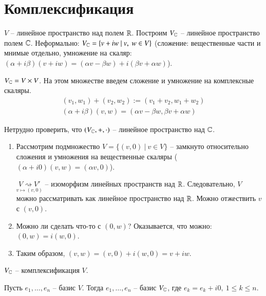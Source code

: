 \documentclass[main]{subfiles}
\begin{document}
\chapter{Комплексификация}

$V$ -- линейное пространство над полем $\mathbb{R}$. Построим $V_{\mathbb{C}}$ -- линейное пространство 
полем $\mathbb{C}$. Неформально: $V_{\mathbb{C}} = \{v +  iw \ | \ v, \ w \in V\}$ (сложение: вещественные части и мнимые отдельно, 
умножение на скаляр: $(\alpha + i\beta) (v + iw) = (\alpha v - \beta w) + i(\beta v + \alpha w)$).

$V_{\mathbb{C}} = V\times V$. На этом множестве введем сложение и умножение на комплексные скаляры.
\begin{gather*}
    (v_1,w_1) + (v_2, w_2) := (v_1 + v_2, w_1 + w_2)  \\
    (\alpha + i\beta) (v, w) = (\alpha v - \beta w, \beta v + \alpha w)
\end{gather*}

Нетрудно проверить, что $(V_{\mathbb{C}}, +, \cdot)$ -- линейное пространство над $\mathbb{C}$.

\begin{enumerate}
    \item Рассмотрим подмножество $V = \{(v, 0) \ | \ v \in V\}$ -- 
    замкнуто относительно сложения и умножения на вещественные скаляры 
    ($(\alpha + i0)(v, w) = (\alpha v, 0)$).
    
    $\underset{v \mapsto (v, 0)}{V \rightsquigarrow V'}$ -- изоморфизм линейных пространств над $\mathbb{R}$. Следовательно, 
    $V$ можно рассматривать как линейное пространство над $\mathbb{R}$. Можно отжествить $v$ с $(v, 0)$.
    \item Можно ли сделать что-то с $(0, w)$? Оказывается, что можно: $(0, w) = i(w, 0)$.
    \item Таким образом, $(v, w) = (v, 0) + i(w, 0) = v +iw$.
\end{enumerate}

$V_{\mathbb{C}}$ -- комплексификация $V$.

\begin{corollary}
    Пусть $e_1, \ldots, e_n$ -- базис $V$. Тогда $e_1, \ldots, e_n$ -- базис $V_{\mathbb{C}}$, где $e_k = e_k + i0, \ 1 \leqslant k\leqslant n $.
\end{corollary}
\end{document}
